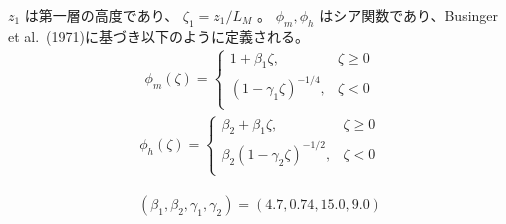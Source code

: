 \(z_1\) は第一層の高度であり、 \(\zeta_1=z_1/L_M\) 。 \(\phi_m,\phi_h\)
はシア関数であり、Businger et al.~(1971)に基づき以下のように定義される。
\begin{eqnarray}
\phi_m(\zeta)=\left\{
    \begin{array}{lr}
      1+\beta_1\zeta, &\zeta\ge 0\\
      \left(1-\gamma_1\zeta\right)^{-1/4}, &\zeta< 0\\
    \end{array}
  \right.
\end{eqnarray} \begin{eqnarray}
\phi_h(\zeta)=\left\{
    \begin{array}{lr}
      \beta_2+\beta_1\zeta, &\zeta\ge 0\\
      \beta_2\left(1-\gamma_2\zeta\right)^{-1/2}, &\zeta< 0\\
    \end{array}
  \right.
\end{eqnarray}

\begin{eqnarray}(\beta_1,\beta_2,\gamma_1,\gamma_2)=(4.7,0.74,15.0,9.0)\end{eqnarray}
